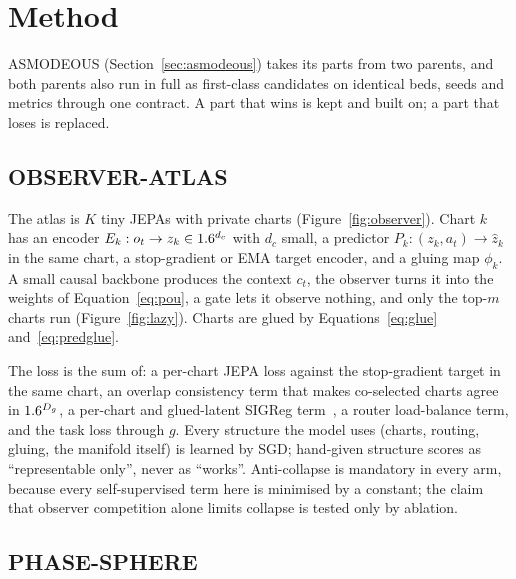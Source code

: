 \section{Method}\label{sec:method}

ASMODEOUS (Section~\ref{sec:asmodeous}) takes its parts from two parents, and both parents also run in full as first-class candidates on identical beds, seeds and metrics through one contract. A part that wins is kept and built on; a part that loses is replaced.

\subsection{OBSERVER-ATLAS}\label{sec:observer-atlas}

The atlas is $K$ tiny JEPAs with private charts (Figure~\ref{fig:observer}). Chart $k$ has an encoder $E_k:o_t\to z_k\in1.6^{d_c}$ with $d_c$ small, a predictor $P_k:(z_k,a_t)\to\hat z_k$ in the same chart, a stop-gradient or EMA target encoder, and a gluing map $\phi_k$. A small causal backbone produces the context $c_t$, the observer turns it into the weights of Equation~\eqref{eq:pou}, a gate lets it observe nothing, and only the top-$m$ charts run (Figure~\ref{fig:lazy}). Charts are glued by Equations~\eqref{eq:glue} and~\eqref{eq:predglue}.

\begin{figure}[t]
  \centering
  
\end{figure}

\begin{figure}[t]
  \centering
  
\end{figure}

The loss is the sum of: a per-chart JEPA loss against the stop-gradient target in the same chart, an overlap consistency term that makes co-selected charts agree in $1.6^{D_g}$, a per-chart and glued-latent SIGReg term~\cite{lejepa}, a router load-balance term, and the task loss through $g$. Every structure the model uses (charts, routing, gluing, the manifold itself) is learned by SGD; hand-given structure scores as ``representable only'', never as ``works''. Anti-collapse is mandatory in every arm, because every self-supervised term here is minimised by a constant; the claim that observer competition alone limits collapse is tested only by ablation.

\subsection{PHASE-SPHERE}

